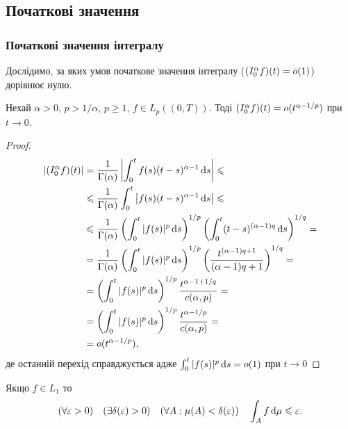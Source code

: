 
\subsection{Початкові значення}

\subsubsection{Початкові значення інтегралу}

Дослідимо, за яких умов початкове значення інтегралу ($(I_0^{\alpha} f)(t) = o(1)$) дорівнює нулю.

\begin{theorem}
    Нехай $\alpha > 0$, $p > 1 / \alpha$, $p \ge 1$, $f \in L_p((0, T))$. Тоді $(I_0^{\alpha} f) (t) = o(t^{\alpha - 1 / p})$ при $t \to 0$.
\end{theorem}

\begin{proof}
    \begin{align*}
        \left| (I_0^{\alpha} f) (t) \right| &= \frac{1}{\Gamma(\alpha)} \left| \int_0^t f(s) (t - s)^{\alpha - 1} \mathop{}\!\mathrm{d} s \right| \leqslant \\
        &\leqslant \frac{1}{\Gamma(\alpha)}  \int_0^t \left| f(s) (t - s)^{\alpha - 1} \mathop{}\!\mathrm{d} s \right| \leqslant \\
        &\leqslant \frac{1}{\Gamma(\alpha)} \left( \int_0^t |f(s)|^p \mathop{}\!\mathrm{d} s \right)^{1/p} \left( \int_0^t (t - s)^{(\alpha - 1) q} \mathop{}\!\mathrm{d} s \right)^{1/q} = \\
        &= \frac{1}{\Gamma(\alpha)} \left( \int_0^t |f(s)|^p \mathop{}\!\mathrm{d} s \right)^{1/p} \left( \frac{t^{(\alpha - 1) q + 1}}{(\alpha - 1) q + 1} \right)^{1 / q} = \\
        &= \left( \int_0^t |f(s)|^p \mathop{}\!\mathrm{d} s \right)^{1/p} \frac{t^{\alpha - 1 + 1 / q}}{c(\alpha, p)} = \\
        &= \left( \int_0^t |f(s)|^p \mathop{}\!\mathrm{d} s \right)^{1/p} \frac{t^{\alpha - 1 / p}}{c(\alpha, p)} = \\
        &= o(t^{\alpha - 1 / p}),
    \end{align*}
    де останній перехід справджується адже $\int_0^t |f(s)|^p \mathop{}\!\mathrm{d} s = o(1)$ при $t \to 0$
\end{proof}

\begin{remark}
    Якщо $f \in L_1$ то
    \begin{equation}
        (\forall \varepsilon > 0) \quad (\exists \delta(\varepsilon) > 0) \quad (\forall A: \mu(A) < \delta(\varepsilon)) \quad \int_A f \mathop{}\!\mathrm{d} \mu \leqslant \varepsilon.
    \end{equation}
\end{remark}

